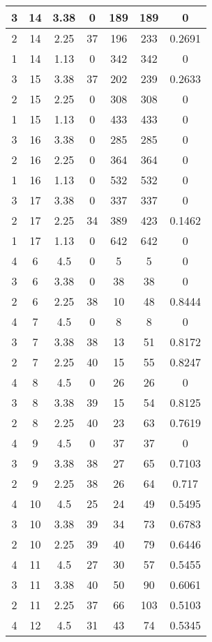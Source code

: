 \documentclass[letterpaper, 12pt]{article}
\begin{document}
\begin{longtable}{|c|c|c|c|c|c|c|}
\hline
3 & 14 & 3.38 & 0 & 189 & 189 & 0 \\
\hline
2 & 14 & 2.25 & 37 & 196 & 233 & 0.2691 \\
\hline
1 & 14 & 1.13 & 0 & 342 & 342 & 0 \\
\hline
3 & 15 & 3.38 & 37 & 202 & 239 & 0.2633 \\
\hline
2 & 15 & 2.25 & 0 & 308 & 308 & 0 \\
\hline
1 & 15 & 1.13 & 0 & 433 & 433 & 0 \\
\hline
3 & 16 & 3.38 & 0 & 285 & 285 & 0 \\
\hline
2 & 16 & 2.25 & 0 & 364 & 364 & 0 \\
\hline
1 & 16 & 1.13 & 0 & 532 & 532 & 0 \\
\hline
3 & 17 & 3.38 & 0 & 337 & 337 & 0 \\
\hline
2 & 17 & 2.25 & 34 & 389 & 423 & 0.1462 \\
\hline
1 & 17 & 1.13 & 0 & 642 & 642 & 0 \\
\hline
4 & 6 & 4.5 & 0 & 5 & 5 & 0 \\
\hline
3 & 6 & 3.38 & 0 & 38 & 38 & 0 \\
\hline
2 & 6 & 2.25 & 38 & 10 & 48 & 0.8444 \\
\hline
4 & 7 & 4.5 & 0 & 8 & 8 & 0 \\
\hline
3 & 7 & 3.38 & 38 & 13 & 51 & 0.8172 \\
\hline
2 & 7 & 2.25 & 40 & 15 & 55 & 0.8247 \\
\hline
4 & 8 & 4.5 & 0 & 26 & 26 & 0 \\
\hline
3 & 8 & 3.38 & 39 & 15 & 54 & 0.8125 \\
\hline
2 & 8 & 2.25 & 40 & 23 & 63 & 0.7619 \\
\hline
4 & 9 & 4.5 & 0 & 37 & 37 & 0 \\
\hline
3 & 9 & 3.38 & 38 & 27 & 65 & 0.7103 \\
\hline
2 & 9 & 2.25 & 38 & 26 & 64 & 0.717 \\
\hline
4 & 10 & 4.5 & 25 & 24 & 49 & 0.5495 \\
\hline
3 & 10 & 3.38 & 39 & 34 & 73 & 0.6783 \\
\hline
2 & 10 & 2.25 & 39 & 40 & 79 & 0.6446 \\
\hline
4 & 11 & 4.5 & 27 & 30 & 57 & 0.5455 \\
\hline
3 & 11 & 3.38 & 40 & 50 & 90 & 0.6061 \\
\hline
2 & 11 & 2.25 & 37 & 66 & 103 & 0.5103 \\
\hline
4 & 12 & 4.5 & 31 & 43 & 74 & 0.5345 \\

\end{longtable}
\end{document}
